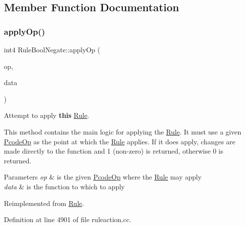 \subsection{Member Function Documentation}
\mbox{\label{class_rule_bool_negate_a0cc46713ccb8464cc054c5eef9ad5de1}} 
\subsubsection{\texorpdfstring{applyOp()}{applyOp()}}
{\footnotesize\ttfamily int4 Rule\+Bool\+Negate\+::apply\+Op (\begin{DoxyParamCaption}\item[{\mbox{\hyperlink{class_pcode_op}{Pcode\+Op}} $\ast$}]{op,  }\item[{\mbox{\hyperlink{class_funcdata}{Funcdata}} \&}]{data }\end{DoxyParamCaption})\hspace{0.3cm}{\ttfamily [virtual]}}



Attempt to apply {\bfseries{this}} \mbox{\hyperlink{class_rule}{Rule}}. 

This method contains the main logic for applying the \mbox{\hyperlink{class_rule}{Rule}}. It must use a given \mbox{\hyperlink{class_pcode_op}{Pcode\+Op}} as the point at which the \mbox{\hyperlink{class_rule}{Rule}} applies. If it does apply, changes are made directly to the function and 1 (non-\/zero) is returned, otherwise 0 is returned. 
\begin{DoxyParams}{Parameters}
{\em op} & is the given \mbox{\hyperlink{class_pcode_op}{Pcode\+Op}} where the \mbox{\hyperlink{class_rule}{Rule}} may apply \\
\hline
{\em data} & is the function to which to apply \\
\hline
\end{DoxyParams}


Reimplemented from \mbox{\hyperlink{class_rule_a4e3e61f066670175009f60fb9dc60848}{Rule}}.



Definition at line 4901 of file ruleaction.\+cc.

